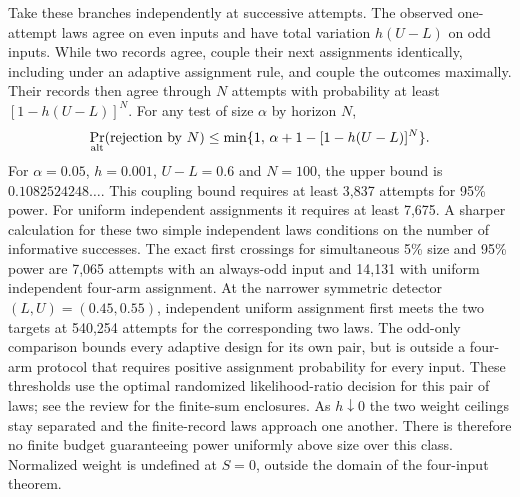 \documentclass[11pt,letterpaper]{article}
\begin{document}
Take these branches independently at successive attempts. The observed one-attempt laws agree on even inputs and have total variation $h(U-L)$ on odd inputs. While two records agree, couple their next assignments identically, including under an adaptive assignment rule, and couple the outcomes maximally. Their records then agree through $N$ attempts with probability at least $[1-h(U-L)]^N$. For any test of size $\alpha$ by horizon $N$,
\[
 \Pr_{\rm alt}(\text{rejection by }N)
 \le \min\{1,\,\alpha+1-[1-h(U-L)]^N\}.
\]
For $\alpha=0.05$, $h=0.001$, $U-L=0.6$ and $N=100$, the upper bound is $0.1082524248\ldots$. This coupling bound requires at least 3,837 attempts for 95\% power. For uniform independent assignments it requires at least 7,675. A sharper calculation for these two simple independent laws conditions on the number of informative successes. The exact first crossings for simultaneous 5\% size and 95\% power are 7,065 attempts with an always-odd input and 14,131 with uniform independent four-arm assignment. At the narrower symmetric detector $(L,U)=(0.45,0.55)$, independent uniform assignment first meets the two targets at 540,254 attempts for the corresponding two laws. The odd-only comparison bounds every adaptive design for its own pair, but is outside a four-arm protocol that requires positive assignment probability for every input. These thresholds use the optimal randomized likelihood-ratio decision for this pair of laws; see the review for the finite-sum enclosures. As $h\downarrow0$ the two weight ceilings stay separated and the finite-record laws approach one another. There is therefore no finite budget guaranteeing power uniformly above size over this class. Normalized weight is undefined at $S=0$, outside the domain of the four-input theorem.
\end{document}
